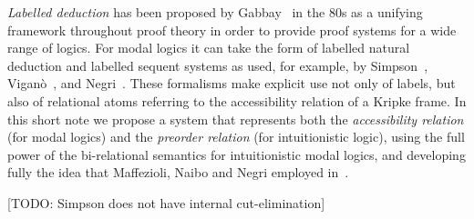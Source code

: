 \documentclass[twoside]{aiml18}
\newcommand{\marianela}[1]{{\color{purple}[Marianela: #1]}}
\newcommand{\sonia}[1]{{\color{blue}[Sonia: #1]}}
\newcommand{\todo}[1]{{\color{red}[TODO: #1]}}
\newcommand{\B}{\mathcal{B}}
\newcommand*{\labels}[2]{{\color{blue}{#1}\:\colon}{#2}}
\newcommand{\SEQ}{\Rightarrow}
\begin{document}
\emph{Labelled deduction} has been proposed by Gabbay~\cite{Gabbay} in the 80s as a unifying framework throughout proof theory in order to provide proof
systems for a wide range of logics. 
%
For modal logics it can take
the form of labelled natural deduction and labelled sequent systems as
used, for example, by Simpson~\cite{Simpson}, Vigan\`o~\cite{Vigano}, and
Negri~\cite{Negri}. 
%
These formalisms make explicit use not only of
labels, but also of relational atoms referring to the accessibility relation of a Kripke frame.
%
In this short note we propose a system that represents both the \emph{accessibility relation} (for modal
logics) and the \emph{preorder relation} (for intuitionistic
logic), using the full power of the bi-relational semantics for
intuitionistic modal logics,
and developing fully the idea that Maffezioli, Naibo and Negri employed in~\cite{Maffezioli}. 

\todo{Simpson does not have internal cut-elimination}
%





\end{document}
